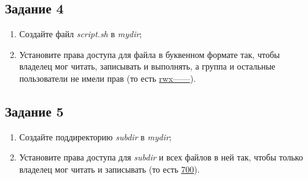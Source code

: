\documentclass[12pt, a4paper]{report}
\begin{document}
		\subsection*{Задание 4}
		\begin{enumerate}
			\item Создайте файл \textit{script.sh} в \textit{mydir};
			\item Установите права доступа для файла в буквенном формате так, чтобы владелец мог читать, записывать и выполнять, а группа и остальные пользователи не имели прав (то есть \underline{rwx------}).
		\end{enumerate}
		\lstset{style=mystyle}
		

		\subsection*{Задание 5}
		\begin{enumerate}
			\item Создайте поддиректорию \textit{subdir} в \textit{mydir};
			\item Установите права доступа для \textit{subdir} и всех файлов в ней так, чтобы только владелец мог читать и записывать (то есть \underline{700}).
		\end{enumerate}
		\lstset{style=mystyle}
		
\end{document}
